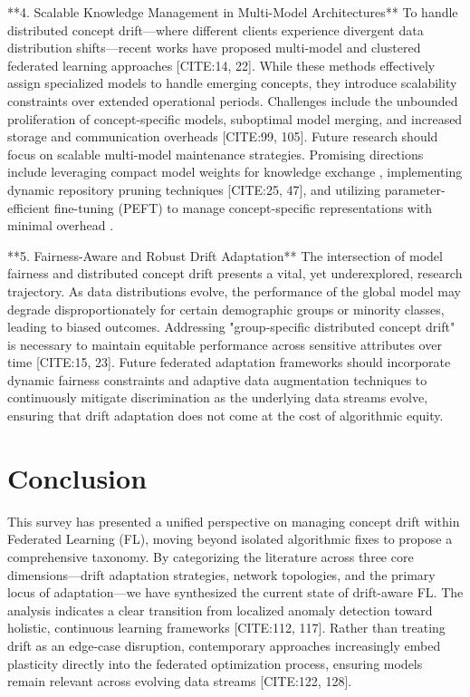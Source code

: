 \documentclass[journal]{IEEEtran}
\begin{document}
**4. Scalable Knowledge Management in Multi-Model Architectures**
To handle distributed concept drift—where different clients experience divergent data distribution shifts—recent works have proposed multi-model and clustered federated learning approaches [CITE:14, 22]. While these methods effectively assign specialized models to handle emerging concepts, they introduce scalability constraints over extended operational periods. Challenges include the unbounded proliferation of concept-specific models, suboptimal model merging, and increased storage and communication overheads [CITE:99, 105]. Future research should focus on scalable multi-model maintenance strategies. Promising directions include leveraging compact model weights for knowledge exchange \cite{Luopan2025}, implementing dynamic repository pruning techniques [CITE:25, 47], and utilizing parameter-efficient fine-tuning (PEFT) to manage concept-specific representations with minimal overhead \cite{paper142}.

**5. Fairness-Aware and Robust Drift Adaptation**
The intersection of model fairness and distributed concept drift presents a vital, yet underexplored, research trajectory. As data distributions evolve, the performance of the global model may degrade disproportionately for certain demographic groups or minority classes, leading to biased outcomes. Addressing "group-specific distributed concept drift" is necessary to maintain equitable performance across sensitive attributes over time [CITE:15, 23]. Future federated adaptation frameworks should incorporate dynamic fairness constraints and adaptive data augmentation techniques \cite{Badar2023} to continuously mitigate discrimination as the underlying data streams evolve, ensuring that drift adaptation does not come at the cost of algorithmic equity.

\section{Conclusion}
\label{sec:conclusion}

This survey has presented a unified perspective on managing concept drift within Federated Learning (FL), moving beyond isolated algorithmic fixes to propose a comprehensive taxonomy. By categorizing the literature across three core dimensions—drift adaptation strategies, network topologies, and the primary locus of adaptation—we have synthesized the current state of drift-aware FL. The analysis indicates a clear transition from localized anomaly detection toward holistic, continuous learning frameworks [CITE:112, 117]. Rather than treating drift as an edge-case disruption, contemporary approaches increasingly embed plasticity directly into the federated optimization process, ensuring models remain relevant across evolving data streams [CITE:122, 128].
\end{document}
